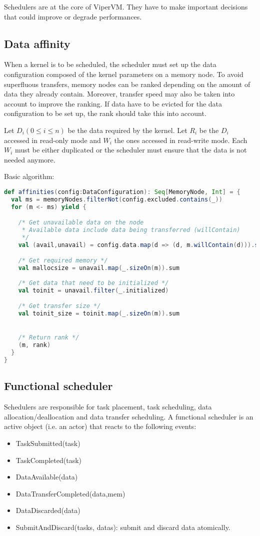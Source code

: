 Schedulers are at the core of ViperVM.
They have to make important decisions that could improve or degrade performances.

\subsection{Data affinity}
When a kernel is to be scheduled, the scheduler must set up the data configuration composed of the kernel parameters on a memory node.
To avoid superfluous transfers, memory nodes can be ranked depending on the amount of data they already contain.
Moreover, transfer speed may also be taken into account to improve the ranking.
If data have to be evicted for the data configuration to be set up, the rank should take this into account.

Let $D_i (0 \le i \le n)$ be the data required by the kernel.
Let $R_i$ be the $D_i$ accessed in read-only mode and $W_i$ the ones accessed in read-write mode.
Each $W_i$ must be either duplicated or the scheduler must ensure that the data is not needed anymore.

Basic algorithm:

\begin{lstlisting}[language=scala]
def affinities(config:DataConfiguration): Seq[MemoryNode, Int] = {
  val ms = memoryNodes.filterNot(config.excluded.contains(_))
  for (m <- ms) yield {

    /* Get unavailable data on the node
     * Available data include data being transferred (willContain)
     */
    val (avail,unavail) = config.data.map(d => (d, m.willContain(d))).split(_._2)

    /* Get required memory */
    val mallocsize = unavail.map(_.sizeOn(m)).sum
    
    /* Get data that need to be initialized */
    val toinit = unavail.filter(_.initialized)

    /* Get transfer size */
    val toinit_size = toinit.map(_.sizeOn(m)).sum


    /* Return rank */
    (m, rank)
  }
}
\end{lstlisting}

\subsection{Functional scheduler}
Schedulers are responsible for task placement, task scheduling, data allocation/deallocation and data transfer scheduling.
A functional scheduler is an active object (i.e. an actor) that reacts to the following events:
\begin{itemize}
  \item TaskSubmitted(task)
  \item TaskCompleted(task)
  \item DataAvailable(data)
  \item DataTransferCompleted(data,mem)
  \item DataDiscarded(data)
  \item SubmitAndDiscard(tasks, datas): submit and discard data atomically.
\end{itemize}

